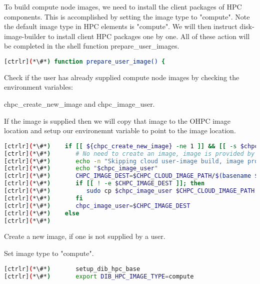 	To build compute node images, we need to install the client packages of HPC components. This is accomplished by setting the image type to "compute". Note the default image type in HPC elements is "compute". We will then instruct disk-image-builder to install client HPC packages one by one. All of these action will be completed in the shell function prepare\_user\_images.

\begin{lstlisting}[language=bash,keywords={}]
[ctrlr](*\#*) function prepare_user_image() {

\end{lstlisting} 

	Check if the user has already supplied compute node images by checking the environment variables:
	
		 chpc\_create\_new\_image and chpc\_image\_user.
		  
	If the image is supplied then we will copy that image to the OHPC image location and setup our environemnt variable to point to the image location.
\begin{lstlisting}[language=bash,keywords={}]
[ctrlr](*\#*)    if [[ ${chpc_create_new_image} -ne 1 ]] && [[ -s $chpc_image_user ]]; then
[ctrlr](*\#*)       # No need to create an image, image is provided by the user
[ctrlr](*\#*)       echo -n "Skipping cloud user-image build, image provided:"
[ctrlr](*\#*)       echo "$chpc_image_user"
[ctrlr](*\#*)       CHPC_IMAGE_DEST=$CHPC_CLOUD_IMAGE_PATH/$(basename $chpc_image_user)
[ctrlr](*\#*)       if [[ ! -e $CHPC_IMAGE_DEST ]]; then
[ctrlr](*\#*)          sudo cp $chpc_image_user $CHPC_CLOUD_IMAGE_PATH
[ctrlr](*\#*)       fi
[ctrlr](*\#*)       chpc_image_user=$CHPC_IMAGE_DEST
[ctrlr](*\#*)    else
[ctrlr](*\#*)    

\end{lstlisting} 


	Create a new image, if one is not supplied by a user. 	
	
	Set image type to "compute".

\begin{lstlisting}[language=bash,keywords={}]
[ctrlr](*\#*)       setup_dib_hpc_base
[ctrlr](*\#*)       export DIB_HPC_IMAGE_TYPE=compute
\end{lstlisting} 
